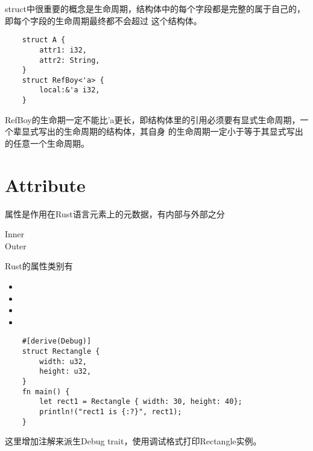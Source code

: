 struct中很重要的概念是生命周期，结构体中的每个字段都是完整的属于自己的，即每个字段的生命周期最终都不会超过
这个结构体。
\begin{lstlisting}
    struct A {
        attr1: i32,
        attr2: String,
    }
    struct RefBoy<'a> {
        local:&'a i32,
    }
\end{lstlisting}
RefBoy的生命期一定不能比'a更长，即结构体里的引用必须要有显式生命周期，一个辈显式写出的生命周期的结构体，其自身
的生命周期一定小于等于其显式写出的任意一个生命周期。

\section{Attribute}

属性是作用在Rust语言元素上的元数据，有内部与外部之分

\begin{description}
    \item [Inner] 
    \item [Outer] 
\end{description}

Rust的属性类别有
\begin{itemize}
    \item {}
    \item {}
    \item {}
    \item {}
\end{itemize}

\begin{lstlisting}
    #[derive(Debug)]
    struct Rectangle {
        width: u32,
        height: u32,
    } 
    fn main() {
        let rect1 = Rectangle { width: 30, height: 40};
        println!("rect1 is {:?}", rect1);
    }
\end{lstlisting}
这里增加注解来派生Debug trait，使用调试格式打印Rectangle实例。

